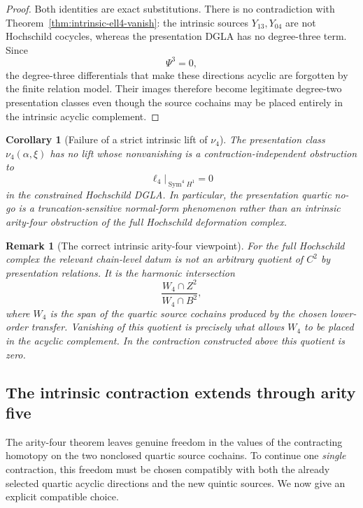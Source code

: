 \documentclass[11pt]{amsart}
\newtheorem{corollary}[theorem]{Corollary}
\newtheorem{remark}[theorem]{Remark}
\begin{document}
\begin{proof}
Both identities are exact substitutions.  There is no contradiction with Theorem~\ref{thm:intrinsic-ell4-vanish}: the intrinsic sources $Y_{13},Y_{04}$ are not Hochschild cocycles, whereas the presentation DGLA has no degree-three term.  Since
\[
\Psi^3=0,
\]
the degree-three differentials that make these directions acyclic are forgotten by the finite relation model.  Their images therefore become legitimate degree-two presentation classes even though the source cochains may be placed entirely in the intrinsic acyclic complement.
\end{proof}

\begin{corollary}[Failure of a strict intrinsic lift of $\nu_4$]\label{cor:no-intrinsic-nu4-lift}
The presentation class $\nu_4(\alpha,\xi)$ has no lift whose nonvanishing is a contraction-independent obstruction to
\[
\ell_4|_{\operatorname{Sym}^4H^1}=0
\]
in the constrained Hochschild DGLA.  In particular, the presentation quartic no-go is a truncation-sensitive normal-form phenomenon rather than an intrinsic arity-four obstruction of the full Hochschild deformation complex.
\end{corollary}

\begin{remark}[The correct intrinsic arity-four viewpoint]
For the full Hochschild complex the relevant chain-level datum is not an arbitrary quotient of $C^2$ by presentation relations.  It is the harmonic intersection
\[
\frac{W_4\cap Z^2}{W_4\cap B^2},
\]
where $W_4$ is the span of the quartic source cochains produced by the chosen lower-order transfer.  Vanishing of this quotient is precisely what allows $W_4$ to be placed in the acyclic complement.  In the contraction constructed above this quotient is zero.
\end{remark}


\subsection{The intrinsic contraction extends through arity five}\label{subsec:intrinsic-quintic}

The arity-four theorem leaves genuine freedom in the values of the contracting homotopy on the two nonclosed quartic source cochains.  To continue one \emph{single} contraction, this freedom must be chosen compatibly with both the already selected quartic acyclic directions and the new quintic sources.  We now give an explicit compatible choice.
\end{document}
